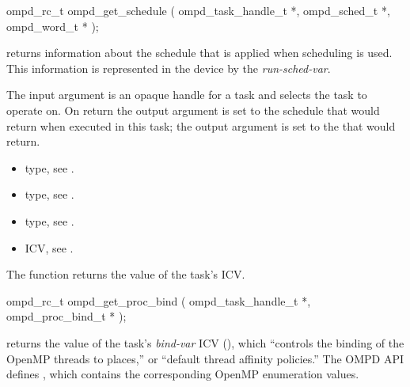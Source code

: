 \format
\cspecificstart
\begin{ompSyntax}
ompd_rc_t ompd_get_schedule (
  ompd_task_handle_t *,
  ompd_sched_t *,
  ompd_word_t *
);
\end{ompSyntax}
\cspecificend

\descr

 returns information about the schedule that is
applied when  scheduling is used.
%
This information is represented in the device by the
\emph{run-sched-var}.

\argdesc
The input argument  is an opaque handle for a task and selects the task to operate on.
On return the output argument  is set to the schedule that  would return when
executed in this task; the output argument  is set to the  that 
 would return.


\crossreferences
\begin{itemize}
	\item {} type, see .
	\item {} type, see .
	\item {} type, see .
	\item {} ICV, see .
\end{itemize}


%
\label{ompd:ompd_get_proc_bind}
\summary
The  function returns the value of the task's  ICV.

\format
\cspecificstart
\begin{ompSyntax}
ompd_rc_t ompd_get_proc_bind (
  ompd_task_handle_t *,
  ompd_proc_bind_t *
);
\end{ompSyntax}
\cspecificend

\descr
{} returns the value of the task's
\emph{bind-var} ICV (), which ``controls the
binding of the OpenMP threads to places,'' or ``default thread
affinity policies.''
%
The OMPD API defines
, which
contains the corresponding OpenMP enumeration values.
%

